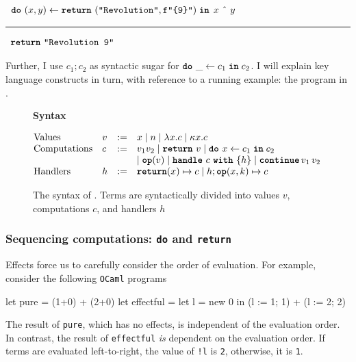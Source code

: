 \begin{eff}
$\begin{array}{l}\bind{(x, y)}{\return{(\texttt{"Revolution"}, \texttt{f"\{9\}"})}}{\, x \text{ \^\ } y}\end{array}$
\vspace{2mm} 
\textcolor{effComment}{\hrule height 0.2mm \relax}
\vspace{2mm} 

\textcolor{effComment}{$\begin{array}{l}\texttt{\textbf{return}} \,\, {\texttt{"Revolution 9"}}\end{array}$}
\end{eff}
Further, I use $c_1;c_2$ as syntactic sugar for $\texttt{\textbf{do}} \,\, {\_} \leftarrow {c_1} \; \textbf{\texttt{in}} \; {c_2}$. 
I will explain key language constructs in turn, with reference to a running example: the \efflang{} program in . 
\begin{figure}
  \begin{eff-desc}
    {\large{\textbf{Syntax}}}

  $\begin{array}{@{}llll}
  \text{Values} & v & := & x \mid n \mid \lambda x. c \mid \kappa x.c\\

  \text{Computations} & c & := & v_1 v_2 \mid \return{v} \mid \bind{x}{c_1}{c_2} \\
                             &&& \mid \op{v} \mid \handleWith{c}{h} \mid \continue{v_1}{v_2} \\ 
  \text{Handlers} & h & := &\returnHandler{x}{c} \mid h;\opHandler{x}{k}{c}
  \end{array}$
  
  \end{eff-desc}
  \caption{The syntax of \efflang. Terms are syntactically divided into values $v$, computations $c$, and handlers $h$ }
  \label{fig:eff-lang-syntax}
\end{figure}

\subsubsection{Sequencing computations: \texttt{do} and \texttt{return}}
Effects force us to carefully consider the order of evaluation. For example, consider the following \texttt{OCaml} programs
\begin{ocaml}
let pure      = (1+0) + (2+0)
let effectful = let l = new 0 in (l := 1; 1) + (l := 2; 2)
\end{ocaml}
The result of \texttt{pure}, which has no effects, is independent of the evaluation order. In contrast, the result of \texttt{effectful} \textit{is} dependent on the evaluation order. If terms are evaluated left-to-right, the value of \texttt{!l} is \texttt{2}, otherwise, it is \texttt{1}.

